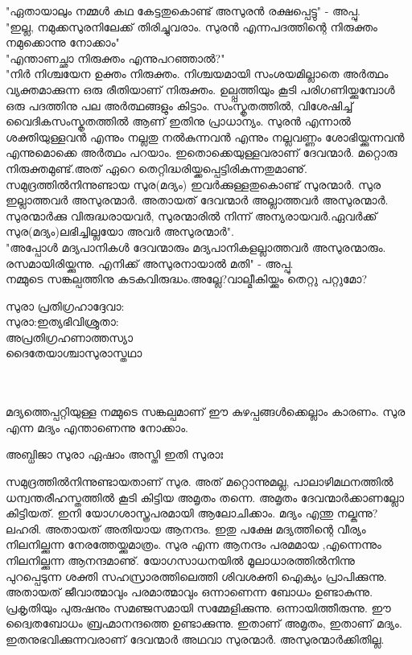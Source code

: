"ഏതായാലും നമ്മൾ കഥ കേട്ടതുകൊണ്ട് അസുരൻ രക്ഷപ്പെട്ടു" - അപ്പു.\\
"ഇല്ല, നമുക്കസുരനിലേക്ക് തിരിച്ചുവരാം. സുരൻ എന്നപദത്തിന്റെ നിരുക്തം നമുക്കൊന്നു നോക്കാം"\\
"എന്താണച്ഛാ നിരുക്തം എന്നുപറഞ്ഞാൽ?"\\
"നിർ നിശ്ചയേന ഉക്തം നിരുക്തം. നിശ്ചയമായി സംശയമില്ലാതെ അർത്ഥം വ്യക്തമാക്കുന്ന ഒരു രീതിയാണ്‌ നിരുക്തം. ഉല്പ്പത്തിയും കൂടി പരിഗണിയ്ക്കുമ്പോൾ ഒരു പദത്തിനു പല അർത്ഥങ്ങളും കിട്ടാം. സംസ്കൃതത്തിൽ, വിശേഷിച്ച് വൈദികസംസ്കൃതത്തിൽ ആണ്‌ ഇതിനു പ്രാധാന്യം. സുരൻ എന്നാൽ ശക്തിയുള്ളവൻ എന്നും നല്ലതു നൽകുന്നവൻ എന്നും നല്ലവണ്ണം ശോഭിയ്ക്കുന്നവൻ എന്നുമൊക്കെ അർത്ഥം പറയാം. ഇതൊക്കെയുള്ളവരാണ്‌ ദേവന്മാർ. മറ്റൊരു നിരുക്തമുണ്ട്.അത് ഏറെ തെറ്റിദ്ധരിയ്ക്കപ്പെട്ടിരികുന്നതുമാണു്. സമുദ്രത്തിൽനിന്നുണ്ടായ സുര(മദ്യം) ഇവർക്കുള്ളതുകൊണ്ട് സുരന്മാർ. സുര ഇല്ലാത്തവർ അസുരന്മാർ. അതായത് ദേവന്മാർ അല്ലാത്തവർ അസുരന്മാർ. സുരന്മാർക്കു വിരുദ്ധരായവർ, സുരന്മാരിൽ നിന്ന് അന്യരായവർ.ഏവർക്ക് സുര(മദ്യം)ലഭിച്ചില്ലയോ അവർ അസുരന്മാർ".\\
"അപ്പോൾ മദ്യപാനികൾ ദേവന്മാരും മദ്യപാനികളല്ലാത്തവർ അസുരന്മാരും. രസമായിരിയ്ക്കുന്നു. എനിക്ക് അസുരനായാൽ മതി" - അപ്പു.\\
നമ്മുടെ സങ്കല്പത്തിനു കടകവിരുദ്ധം.അല്ലേ?വാല്മീകിയ്ക്കും തെറ്റു പറ്റുമോ?\\
\begin{minipage}{\linewidth}
\begin{center}
സുരാ പ്രതിഗ്രഹാദ്ദേവാ:\\
സുരാ:ഇത്യഭിവിശ്രുതാ:\\
അപ്രതിഗ്രഹണാത്തസ്യാ\\
ദൈതേയാശ്ചാസുരാസ്തഥാ\\
\end{center}
\end{minipage}\\\\
മദ്യത്തെപ്പറ്റിയുള്ള നമ്മുടെ സങ്കല്പമാണ്‌ ഈ കുഴപ്പങ്ങൾക്കെല്ലാം കാരണം. സുര എന്ന മദ്യം എന്താണെന്നു നോക്കാം. 
\begin{center}
അബ്ധിജാ സുരാ ഏഷാം അസ്തി ഇതി സുരാഃ
\end{center}
സമുദ്രത്തിൽനിന്നുണ്ടായതാണ്‌ സുര. അത് മറ്റൊന്നുമല്ല, പാലാഴിമഥനത്തിൽ ധന്വന്തരീഹസ്തത്തിൽ കൂടി കിട്ടിയ അമൃതം തന്നെ. അമൃതം ദേവന്മാർക്കാണല്ലോ കിട്ടിയത്. ഇനി യോഗശാസ്ത്രപരമായി ആലോചിക്കാം. മദ്യം എന്തു നല്കുന്നു? ലഹരി. അതായത് അതിയായ ആനന്ദം. ഇതു പക്ഷേ മദ്യത്തിന്റെ വീര്യം നിലനില്ക്കുന്ന നേരത്തേയ്ക്കുമാത്രം. സുര എന്ന ആനന്ദം പരമമായ ,എന്നെന്നും നിലനില്ക്കുന്ന ആനന്ദമാണു്. യോഗസാധനയിൽ മൂലാധാരത്തിൽനിന്നു പുറപ്പെടുന്ന ശക്തി സഹസ്രാരത്തിലെത്തി ശിവശക്തി ഐക്യം പ്രാപിക്കുന്നു. അതായത് ജീവാത്മാവും പരമാത്മാവും ഒന്നാണെന്ന ബോധം ഉണ്ടാകുന്നു. പ്രകൃതിയും പുരുഷനും സമഞ്ജസമായി സമ്മേളിക്കുന്നു. ഒന്നായിത്തീരുന്നു. ഈ ദ്വൈതബോധം ബ്രഹ്മാനന്ദത്തെ ഉണ്ടാക്കുന്നു. ഇതാണ്‌ അമൃതം, ഇതാണ്‌ മദ്യം. ഇതനുഭവിക്കുന്നവരാണ്‌ ദേവന്മാർ അഥവാ സുരന്മാർ. അസുരന്മാർക്കിതില്ല.\\

